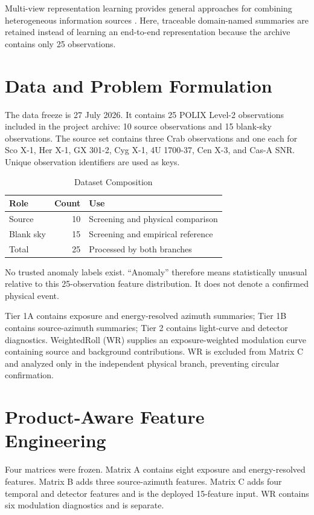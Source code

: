 \documentclass[conference]{IEEEtran}
\begin{document}
Multi-view representation learning provides general approaches for combining heterogeneous information sources \cite{hwang2021multiview}. Here, traceable domain-named summaries are retained instead of learning an end-to-end representation because the archive contains only 25 observations.

\section{Data and Problem Formulation}

The data freeze is 27 July 2026. It contains 25 POLIX Level-2 observations included in the project archive: 10 source observations and 15 blank-sky observations. The source set contains three Crab observations and one each for Sco X-1, Her X-1, GX 301-2, Cyg X-1, 4U 1700-37, Cen X-3, and Cas-A SNR. Unique observation identifiers are used as keys.

\begin{table}[t]
\caption{Dataset Composition}
\label{tab:data}
\centering
\begin{tabular}{lrl}
\toprule
Role & Count & Use \\
\midrule
Source & 10 & Screening and physical comparison \\
Blank sky & 15 & Screening and empirical reference \\
Total & 25 & Processed by both branches \\
\bottomrule
\end{tabular}
\end{table}

No trusted anomaly labels exist. ``Anomaly'' therefore means statistically unusual relative to this 25-observation feature distribution. It does not denote a confirmed physical event.

Tier 1A contains exposure and energy-resolved azimuth summaries; Tier 1B contains source-azimuth summaries; Tier 2 contains light-curve and detector diagnostics. WeightedRoll (WR) supplies an exposure-weighted modulation curve containing source and background contributions. WR is excluded from Matrix C and analyzed only in the independent physical branch, preventing circular confirmation.

\section{Product-Aware Feature Engineering}

Four matrices were frozen. Matrix A contains eight exposure and energy-resolved features. Matrix B adds three source-azimuth features. Matrix C adds four temporal and detector features and is the deployed 15-feature input. WR contains six modulation diagnostics and is separate.
\end{document}
